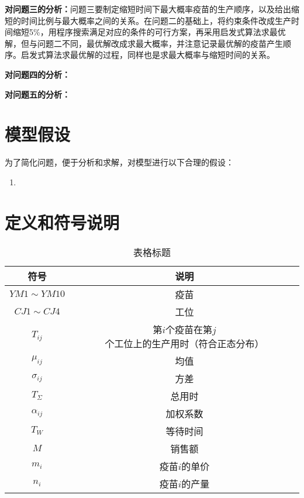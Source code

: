 \documentclass[UTF8]{ctexart}
\begin{document}
	\textbf{对问题三的分析：}问题三要制定缩短时间下最大概率疫苗的生产顺序，以及给出缩短的时间比例与最大概率之间的关系。在问题二的基础上，将约束条件改成生产时间缩短5\%，用程序搜索满足对应的条件的可行方案，再采用启发式算法求最优解，但与问题二不同，最优解改成求最大概率，并注意记录最优解的疫苗产生顺序。启发式算法求最优解的过程，同样也是求最大概率与缩短时间的关系。
	
	\textbf{对问题四的分析：}
	
	
	\textbf{对问题五的分析：}
	
	
	\section{模型假设}
	为了简化问题，便于分析和求解，对模型进行以下合理的假设：
	\begin{enumerate}
		\item
	\end{enumerate}
	
	\section{定义和符号说明}
	\begin{table}[htbp]
		\centering
		\begin{tabular}{ c c }
			\toprule[2pt]
			符号 & 说明   \\
			\hline
			$YM1\sim YM10$ & 疫苗  \\
			$CJ1\sim CJ4$ &  工位 \\
			$T_{ij}$&  第$i$个疫苗在第$j$个工位上的生产用时（符合正态分布）\\
			$\mu_{ij}$& 均值\\
			$\sigma_{ij}$ & 方差\\
			$T_{\Sigma}$ & 总用时 \\
			$\alpha_{ij}$ & 加权系数\\
			$T_{W}$ & 等待时间 \\
			$M$ & 销售额 \\
			$m_{i}$ & 疫苗$i$的单价 \\
			$n_{i}$ & 疫苗$i$的产量 \\
			  
			\bottomrule[2pt]
		\end{tabular}\caption{表格标题}\label{p1}
	\end{table}
	
\end{document}
